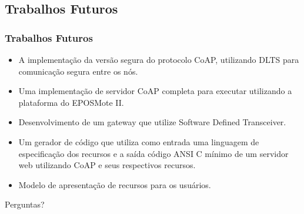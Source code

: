 \documentclass{beamer}
\begin{document}
\subsection{Trabalhos Futuros}
\begin{frame}
\frametitle{Trabalhos Futuros}

\begin{itemize}
    \item A implementa\c{c}\~ao da vers\~ao segura do protocolo CoAP, utilizando DLTS para comunica\c{c}\~ao segura entre os n\'os.
    \item Uma implementa\c{c}\~ao de servidor CoAP completa para executar utilizando a plataforma do EPOSMote II.

    \item Desenvolvimento de um gateway que utilize Software Defined Transceiver.

    \item Um gerador de c\'odigo que utiliza como entrada uma linguagem de especifica\c{c}\~ao dos recursos e a sa\'ida c\'odigo ANSI C m\'inimo de um servidor web utilizando CoAP e seus respectivos recursos.

    \item Modelo de apresentação de recursos para os usuários.
\end{itemize}
\end{frame}




%




\begin{frame}
\Huge{\centerline{Perguntas?}}
\end{frame}

\end{document}
